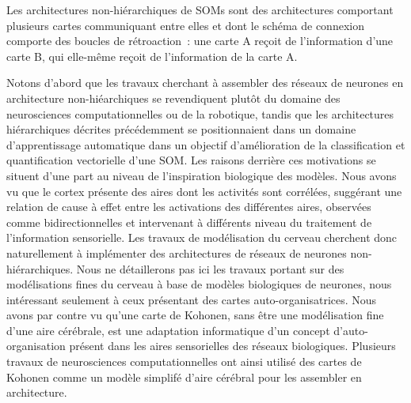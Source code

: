 \documentclass[../main]{subfiles}
\begin{document}
{Les architectures non-hiérarchiques de SOMs sont des architectures comportant plusieurs cartes communiquant entre elles et dont le schéma de connexion comporte des boucles de rétroaction~: une carte A reçoit de l'information d'une carte B, qui elle-même reçoit de l'information de la carte A.


Notons d'abord que les travaux cherchant à assembler des réseaux de neurones en architecture non-hiéarchiques se revendiquent plutôt du domaine des neurosciences computationnelles ou de la robotique, tandis que les architectures hiérarchiques décrites précédemment se positionnaient dans un domaine d'apprentissage automatique dans un objectif d'amélioration de la classification et quantification vectorielle d'une SOM.
Les raisons derrière ces motivations se situent d'une part au niveau de l'inspiration biologique des modèles. 
Nous avons vu que le cortex présente des aires dont les activités sont corrélées, suggérant une relation de cause à effet entre les activations des différentes aires, observées comme bidirectionnelles et intervenant à différents niveau du traitement de l'information sensorielle.
Les travaux de modélisation du cerveau cherchent donc naturellement à implémenter des architectures de réseaux de neurones non-hiérarchiques. 
Nous ne détaillerons pas ici les travaux portant sur des modélisations fines du cerveau à base de modèles biologiques de neurones, nous intéressant seulement à ceux présentant des cartes auto-organisatrices.
Nous avons par contre vu qu'une carte de Kohonen, sans être une modélisation fine d'une aire cérébrale, est une adaptation informatique d'un concept d'auto-organisation présent dans les aires sensorielles des réseaux biologiques. Plusieurs travaux de neurosciences computationnelles ont ainsi utilisé des cartes de Kohonen comme un modèle simplifé d'aire cérébral pour les assembler en architecture.


}
\end{document}
